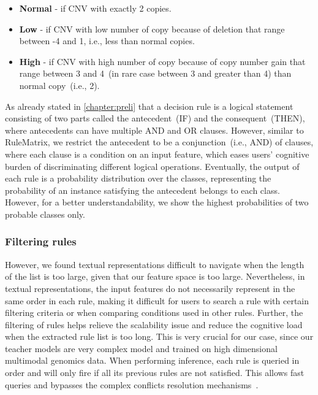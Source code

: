 \vspace{-2mm}
\begin{itemize}[noitemsep]
    \item \textbf{Normal} - if CNV with exactly 2 copies.
    \item\textbf{Low} - if CNV with low number of copy because of deletion that range between -4 and 1, i.e., less than normal copies.
    \item\textbf{High} - if CNV with high number of copy because of copy number gain that range between 3 and 4~(in rare case between 3 and greater than 4) than normal copy~(i.e., 2).
\end{itemize}
\vspace{-2mm}

\hspace*{3.5mm} As already stated in \cref{chapter:preli} that a decision rule is a logical statement consisting of two parts called the antecedent~(IF) and the consequent~(THEN), where antecedents can have multiple AND and OR clauses. However, similar to RuleMatrix, we restrict the antecedent to be a conjunction~(i.e., AND) of clauses, where each clause is a condition on an input feature, which eases users' cognitive burden of discriminating different logical operations. Eventually, the output of each rule is a probability distribution over the classes, representing the probability of an instance satisfying the antecedent belongs to each class. However, for a better understandability, we show the highest probabilities of two probable classes only. 

\subsubsection{Filtering rules}
However, we found textual representations difficult to navigate when the length of the list is too large, given that our feature space is too large. Nevertheless, in textual representations, the input features do not necessarily represent in the same order in each rule, making it  difficult for users to search a rule with certain filtering criteria or when comparing conditions used in other rules. Further, the filtering of rules helps relieve the scalability issue and reduce the cognitive load when the extracted rule list is too long. This is very crucial for our case, since our teacher models are very complex model and trained on high dimensional multimodal genomics data. When performing inference, each rule is queried in order and will only fire if all its previous rules are not satisfied. This allows fast queries and bypasses the complex conflicts resolution mechanisms~\cite{ribeiro2018anchors}.

